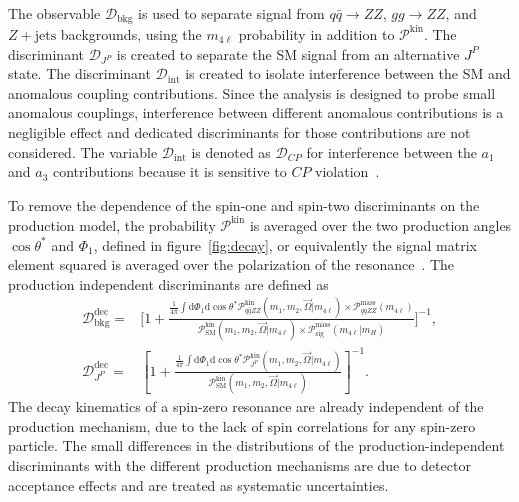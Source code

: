 The observable $\mathcal{D}_\text{bkg}$ is used to separate signal from $q\bar{q} \to ZZ$, $gg \to ZZ$, and $Z+\text{jets}$ backgrounds,
using the $m_{4\ell}$ probability in addition to $\mathcal{P}^\text{kin}$. The discriminant $\mathcal{D}_{J^P}$ is created to separate
the SM signal from an alternative $J^P$ state. The discriminant $\mathcal{D}_\text{int}$ is created to isolate interference between
the SM and anomalous coupling contributions. Since the analysis is designed to probe small anomalous couplings, interference
between different anomalous contributions is a negligible effect and dedicated discriminants for those contributions are not
considered. The variable $\mathcal{D}_\text{int}$ is denoted as $\mathcal{D}_{C\!P}$ for interference between the $a_{1}$ and $a_{3}$ contributions
because it is sensitive to $CP$ violation~\cite{Anderson:2013afp}.


To remove the dependence of the spin-one and spin-two discriminants on the production model,
the probability $\mathcal{P}^\text{kin}$ is averaged over the two production angles $\cos\theta^*$ and $\Phi_1$,
defined in figure~\ref{fig:decay}, or equivalently the signal matrix element squared is averaged over the
polarization of the resonance~\cite{Anderson:2013afp}. The production independent discriminants
are defined as
\begin{equation}\begin{aligned}
\label{eq:melaSigProd}
\mathcal{D}^\text{dec}_\text{bkg} =&
\Bigg[1+\frac{\frac{1}{4\pi}\int \mathrm{d}\Phi_1  \mathrm{d}\cos\theta^{*}
\mathcal{P}^\text{kin}_{q\bar{q}ZZ} (m_1, m_2, \vec\Omega | m_{4\ell})\times \mathcal{P}^\text{mass}_{q\bar{q}ZZ} (m_{4\ell})  }
{\mathcal{P}^\text{kin}_\mathrm{SM} (m_1, m_2, \vec\Omega | m_{4\ell}) \times \mathcal{P}^\text{mass}_\text{sig} (m_{4\ell}|m_{H}) } \Bigg]^{-1} ,
 \\
\mathcal{D}^\text{dec}_{J^P} =&
\left[1+\frac{\frac{1}{4\pi}\int \mathrm{d}\Phi_1  \mathrm{d}\cos\theta^{*}
\mathcal{P}^\text{kin}_{J^P} (m_1, m_2, \vec\Omega | m_{4\ell}) }
{\mathcal{P}^\text{kin}_\mathrm{SM} (m_1, m_2, \vec\Omega | m_{4\ell}) } \right]^{-1} .
\end{aligned}\end{equation}
The decay kinematics of a spin-zero resonance are already independent of the production
mechanism, due to the lack of spin correlations for any spin-zero particle.
The small differences in the distributions of the production-independent discriminants
with the different production mechanisms are due to detector acceptance effects
and are treated as systematic uncertainties.

